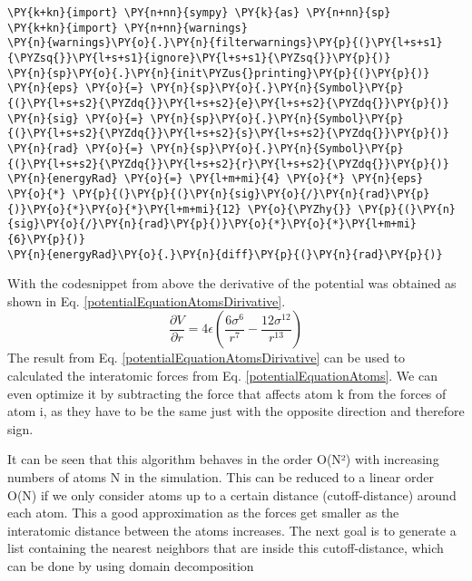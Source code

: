 \begin{tcolorbox}[breakable, size=fbox, boxrule=1pt, pad at break*=1mm,colback=cellbackground, colframe=cellborder]
\begin{Verbatim}[commandchars=\\\{\}]
\PY{k+kn}{import} \PY{n+nn}{sympy} \PY{k}{as} \PY{n+nn}{sp}
\PY{k+kn}{import} \PY{n+nn}{warnings}
\PY{n}{warnings}\PY{o}{.}\PY{n}{filterwarnings}\PY{p}{(}\PY{l+s+s1}{\PYZsq{}}\PY{l+s+s1}{ignore}\PY{l+s+s1}{\PYZsq{}}\PY{p}{)}
\PY{n}{sp}\PY{o}{.}\PY{n}{init\PYZus{}printing}\PY{p}{(}\PY{p}{)}
\PY{n}{eps} \PY{o}{=} \PY{n}{sp}\PY{o}{.}\PY{n}{Symbol}\PY{p}{(}\PY{l+s+s2}{\PYZdq{}}\PY{l+s+s2}{e}\PY{l+s+s2}{\PYZdq{}}\PY{p}{)}
\PY{n}{sig} \PY{o}{=} \PY{n}{sp}\PY{o}{.}\PY{n}{Symbol}\PY{p}{(}\PY{l+s+s2}{\PYZdq{}}\PY{l+s+s2}{s}\PY{l+s+s2}{\PYZdq{}}\PY{p}{)}
\PY{n}{rad} \PY{o}{=} \PY{n}{sp}\PY{o}{.}\PY{n}{Symbol}\PY{p}{(}\PY{l+s+s2}{\PYZdq{}}\PY{l+s+s2}{r}\PY{l+s+s2}{\PYZdq{}}\PY{p}{)}
\PY{n}{energyRad} \PY{o}{=} \PY{l+m+mi}{4} \PY{o}{*} \PY{n}{eps} \PY{o}{*} \PY{p}{(}\PY{p}{(}\PY{n}{sig}\PY{o}{/}\PY{n}{rad}\PY{p}{)}\PY{o}{*}\PY{o}{*}\PY{l+m+mi}{12} \PY{o}{\PYZhy{}} \PY{p}{(}\PY{n}{sig}\PY{o}{/}\PY{n}{rad}\PY{p}{)}\PY{o}{*}\PY{o}{*}\PY{l+m+mi}{6}\PY{p}{)}
\PY{n}{energyRad}\PY{o}{.}\PY{n}{diff}\PY{p}{(}\PY{n}{rad}\PY{p}{)}
	\end{Verbatim}
\end{tcolorbox}

With the codesnippet from above the derivative of the potential was obtained as shown in Eq. \ref{potentialEquationAtomsDirivative}.
\begin{equation}
	\label{potentialEquationAtomsDirivative}
	\frac{\partial V}{\partial r} = 4 \epsilon \left(\frac{6 \sigma^{6}}{r^{7}} - \frac{12 \sigma^{12}}{r^{13}}\right)
\end{equation}
The result from Eq. \ref{potentialEquationAtomsDirivative} can be used to calculated the interatomic forces from Eq. \ref {potentialEquationAtoms}. 
We can even optimize it by subtracting the force that affects atom k from the forces of atom i, as they have to be the same just with the opposite direction and therefore sign. 
\par 
It can be seen that this algorithm behaves in the order O(N²) with increasing numbers of atoms N in the simulation. This can be reduced to a linear order O(N) if we only consider atoms up to a certain distance (cutoff-distance) around each atom. This a good approximation as the forces get smaller as the interatomic distance between the atoms increases. The next goal is to generate a list containing the nearest neighbors that are inside this cutoff-distance, which can be done by using domain decomposition \cite[cf.][]{molDymCourse}
